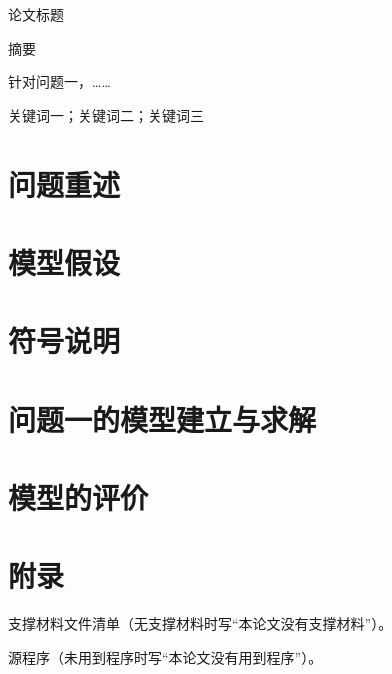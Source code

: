 \documentclass[UTF8,12pt,a4paper]{ctexart}
\newcommand{\PaperTitle}{论文标题}
\begin{document}
\begin{center}
  {\heiti \PaperTitle}\par\medskip
  {\heiti 摘\quad 要}
\end{center}
针对问题一，……

\medskip
{}关键词一；关键词二；关键词三
\clearpage

\section{问题重述}
\section{模型假设}
\section{符号说明}
\section{问题一的模型建立与求解}
\section{模型的评价}

% 

\clearpage
\appendix
\section*{附录}
支撑材料文件清单（无支撑材料时写“本论文没有支撑材料”）。

源程序（未用到程序时写“本论文没有用到程序”）。
\end{document}
